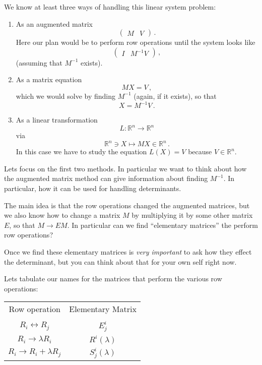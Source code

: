 {We know at least three ways of handling this linear system problem:
\begin{enumerate}
\item As an augmented matrix
\[
\left(
\begin{array}{c|c}
M & V
\end{array}
\right)\, .
\]
Here our plan would be to perform row operations until the system looks like
\[
\left(
\begin{array}{c|c}
I & M^{-1}V
\end{array}
\right)\, ,
\]
(assuming that $M^{-1}$ exists).
\item As a matrix equation
\[
MX=V\, ,
\]
which we would solve by finding $M^{-1}$ (again, if it exists), so that
\[
X=M^{-1}V\, .
\]
\item As a linear transformation
\[L:{\mathbb R}^n\longrightarrow {\mathbb R}^n\]
via
\[
{\mathbb R}^n\ni X \longmapsto MX \in {\mathbb R}^n\, .
\]
In this case we have to study the equation $L(X)=V$ because $V\in {\mathbb R}^n$.
\end{enumerate}
Lets focus on the first two methods. In particular we want to think about how the augmented matrix  method can give information about finding $M^{-1}$. In particular, how it can be used for handling determinants. 

The main idea is that the row operations changed the augmented matrices, but we also know how to change a matrix $M$ by multiplying it by some other matrix $E$, so that $M\to EM$.
In particular can we find ``elementary matrices'' the perform row operations?

Once we find these elementary matrices is {\itshape very important} to  ask how they effect the determinant, but you can think about that for your own self  right now. 

Lets tabulate our names for the matrices that perform the various row operations:
\begin{center}
\begin{tabular}{cc}
Row operation & Elementary Matrix\\\smallskip\hline\\
$R_i\leftrightarrow R_j$ & $E^i_j$\\\smallskip
$R_i\to \lambda R_i$ & $R^i(\lambda)$\\\smallskip
$R_i\to R_i+\lambda R_j$ & $S^i_j(\lambda)$
\end{tabular}
\end{center}

}
